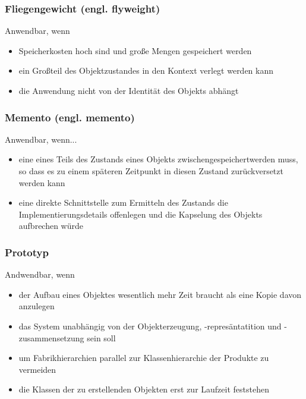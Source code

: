 \subsubsection{Fliegengewicht (engl. flyweight)}
Anwendbar, wenn
\begin{itemize}
    \item Speicherkosten hoch sind und große Mengen gespeichert werden
    \item ein Großteil des Objektzustandes in den Kontext verlegt werden kann
    \item die Anwendung nicht von der Identität des Objekts abhängt
\end{itemize}



\subsubsection{Memento (engl. memento)}
Anwendbar, wenn...
\begin{itemize}
    \item eine  eines Teils des Zustands eines Objekts zwischengespeichertwerden muss, so dass es zu einem späteren Zeitpunkt in diesen Zustand zurückversetzt werden kann
    \item eine direkte Schnittstelle zum Ermitteln des Zustands die Implementierungsdetails offenlegen und die Kapselung des Objekts aufbrechen würde
\end{itemize}

\subsubsection{Prototyp}
Andwendbar, wenn
\begin{itemize}
    \item der Aufbau eines Objektes wesentlich mehr Zeit braucht als eine Kopie davon anzulegen
    \item das System unabhängig von der Objekterzeugung, -represäntatition und -zusammensetzung sein soll
    \item um Fabrikhierarchien parallel zur Klassenhierarchie der Produkte zu vermeiden
    \item die Klassen der zu erstellenden Objekten erst zur Laufzeit feststehen
\end{itemize}


